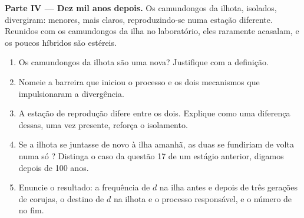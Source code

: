 \begin{problem}
\medskip
\noindent\textbf{Parte IV --- Dez mil anos depois.}
Os camundongos da ilhota, isolados, divergiram: menores, mais claros,
reproduzindo-se numa estação diferente. Reunidos com os camundongos da
ilha no laboratório, eles raramente acasalam, e os poucos híbridos são
estéreis.
\begin{enumerate}[resume]
  \item Os camundongos da ilhota são uma  nova? Justifique com a
        definição.
  \item Nomeie a barreira que iniciou o processo e os dois mecanismos
        que impulsionaram a divergência.
  \item A estação de reprodução difere entre os dois. Explique como uma
        diferença dessas, uma vez presente, reforça o isolamento.
  \item Se a ilhota se juntasse de novo à ilha amanhã, as duas se
        fundiriam de volta numa só ? Distinga o caso da
        questão 17 de um estágio anterior, digamos depois de 100 anos.
  \item Enuncie o resultado: a frequência de $d$ na ilha antes e depois
        de três gerações de corujas, o destino de $d$ na ilhota e o
        processo responsável, e o número de  no fim.
\end{enumerate}
\end{problem}
